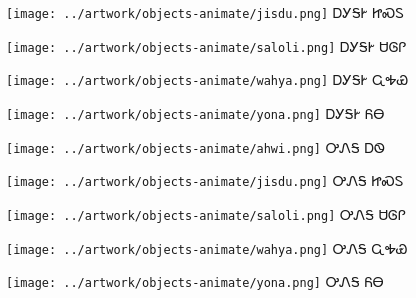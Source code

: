 \documentclass[avery5371]{flashcards}%
\begin{document}
\begin{flashcard}{
\texttt{[image: ../artwork/objects-animate/jisdu.png]}
}\Huge ᎠᎩᎦᎨ ᏥᏍᏚ
\end{flashcard}

\begin{flashcard}{
\texttt{[image: ../artwork/objects-animate/saloli.png]}
}\Huge ᎠᎩᎦᎨ ᏌᎶᎵ
\end{flashcard}

\begin{flashcard}{
\texttt{[image: ../artwork/objects-animate/wahya.png]}
}\Huge ᎠᎩᎦᎨ ᏩᎭᏯ
\end{flashcard}

\begin{flashcard}{
\texttt{[image: ../artwork/objects-animate/yona.png]}
}\Huge ᎠᎩᎦᎨ ᏲᎾ
\end{flashcard}

\begin{flashcard}{
\texttt{[image: ../artwork/objects-animate/ahwi.png]}
}\Huge ᎤᏁᎦ ᎠᏫ
\end{flashcard}

\begin{flashcard}{
\texttt{[image: ../artwork/objects-animate/jisdu.png]}
}\Huge ᎤᏁᎦ ᏥᏍᏚ
\end{flashcard}

\begin{flashcard}{
\texttt{[image: ../artwork/objects-animate/saloli.png]}
}\Huge ᎤᏁᎦ ᏌᎶᎵ
\end{flashcard}

\begin{flashcard}{
\texttt{[image: ../artwork/objects-animate/wahya.png]}
}\Huge ᎤᏁᎦ ᏩᎭᏯ
\end{flashcard}

\begin{flashcard}{
\texttt{[image: ../artwork/objects-animate/yona.png]}
}\Huge ᎤᏁᎦ ᏲᎾ
\end{flashcard}
\end{document}
